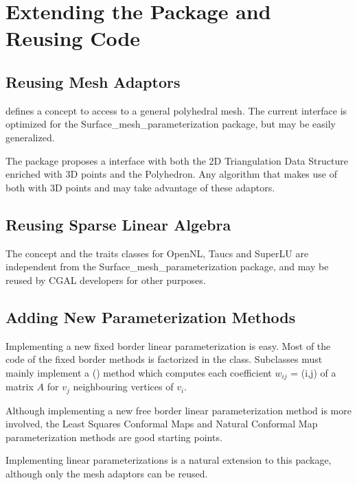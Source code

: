 \section{Extending the Package and Reusing Code}

\subsection{Reusing Mesh Adaptors}

 defines a concept to access to a
general polyhedral mesh.  The current interface is optimized for the
Surface_mesh_parameterization package, but may be easily generalized.

The package proposes a  interface with
both the 2D Triangulation Data Structure enriched with 3D points and
the Polyhedron. Any algorithm that makes use of both
 with 3D points and
 may take advantage of these adaptors.


\subsection{Reusing Sparse Linear Algebra}

The  concept and the traits classes
for OpenNL, {\sc Taucs} and SuperLU are independent from the
Surface_mesh_parameterization package, and may be reused by CGAL developers for
other purposes.


\subsection{Adding New Parameterization Methods}

Implementing a new fixed border linear parameterization is easy.  Most
of the code of the fixed border methods is factorized in the
 class.  Subclasses must mainly
implement a () method which computes each
coefficient $w_{ij}$ = (i,j) of a matrix $A$ for $v_j$ neighbouring
vertices of $v_i$.

Although implementing a new free border linear parameterization
method is more involved, the Least Squares Conformal Maps and Natural
Conformal Map parameterization methods are good starting points.

Implementing  linear parameterizations is a natural extension
to this package, although only the mesh adaptors can be reused.


